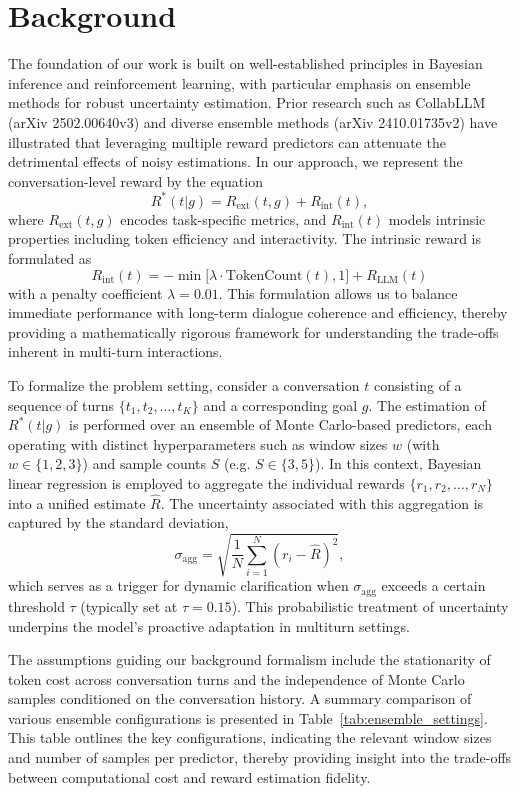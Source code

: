\documentclass{article}
\begin{document}
\section{Background}
The foundation of our work is built on well-established principles in Bayesian inference and reinforcement learning, with particular emphasis on ensemble methods for robust uncertainty estimation. Prior research such as CollabLLM (arXiv 2502.00640v3) and diverse ensemble methods (arXiv 2410.01735v2) have illustrated that leveraging multiple reward predictors can attenuate the detrimental effects of noisy estimations. In our approach, we represent the conversation-level reward by the equation 
\[
R^*(t|g) = R_{\text{ext}}(t, g) + R_{\text{int}}(t),
\]
where \(R_{\text{ext}}(t, g)\) encodes task-specific metrics, and \(R_{\text{int}}(t)\) models intrinsic properties including token efficiency and interactivity. The intrinsic reward is formulated as 
\[
R_{\text{int}}(t) = -\min\bigl[\lambda\cdot \text{TokenCount}(t), 1\bigr] + R_{\text{LLM}}(t)
\]
with a penalty coefficient \(\lambda=0.01\). This formulation allows us to balance immediate performance with long-term dialogue coherence and efficiency, thereby providing a mathematically rigorous framework for understanding the trade-offs inherent in multi-turn interactions.

To formalize the problem setting, consider a conversation \(t\) consisting of a sequence of turns \(\{t_1, t_2, \ldots, t_K\}\) and a corresponding goal \(g\). The estimation of \(R^*(t|g)\) is performed over an ensemble of Monte Carlo-based predictors, each operating with distinct hyperparameters such as window sizes \(w\) (with \(w \in \{1,2,3\}\)) and sample counts \(S\) (e.g. \(S \in \{3,5\}\)). In this context, Bayesian linear regression is employed to aggregate the individual rewards \(\{r_1, r_2, \ldots, r_N\}\) into a unified estimate \(\hat{R}\). The uncertainty associated with this aggregation is captured by the standard deviation,
\[
\sigma_{\text{agg}} = \sqrt{\frac{1}{N}\sum_{i=1}^N (r_i - \hat{R})^2},
\]
which serves as a trigger for dynamic clarification when \(\sigma_{\text{agg}}\) exceeds a certain threshold \(\tau\) (typically set at \(\tau=0.15\)). This probabilistic treatment of uncertainty underpins the model’s proactive adaptation in multiturn settings.

The assumptions guiding our background formalism include the stationarity of token cost across conversation turns and the independence of Monte Carlo samples conditioned on the conversation history. A summary comparison of various ensemble configurations is presented in Table~\ref{tab:ensemble_settings}. This table outlines the key configurations, indicating the relevant window sizes and number of samples per predictor, thereby providing insight into the trade-offs between computational cost and reward estimation fidelity.
\end{document}
